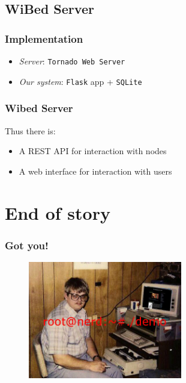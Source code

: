 \documentclass[usepdftitle=false,13pt]{beamer}
\begin{document}
\subsection{WiBed Server}

\begin{frame}\frametitle{Implementation}

	\begin{itemize}
		\item \textit{Server}:  \texttt{Tornado Web Server}
		\item \textit{Our system}: \texttt{Flask} app + \texttt{SQLite}
	\end{itemize}

\end{frame}


\begin{frame}\frametitle{Wibed Server}

	Thus there is:
	\begin{itemize}
		\item A REST API for interaction with nodes
		\item A web interface for interaction with users
	\end{itemize}

\end{frame}

\section{End of story}

\begin{frame}\frametitle{Got you!}

	\begin{figure}[h!]
	\begin{center}
	\includegraphics[width=0.6\textwidth]{pic/nerd}
	\label{fig:sdn}
	\end{center}
	\end{figure}

\end{frame}
\end{document}
